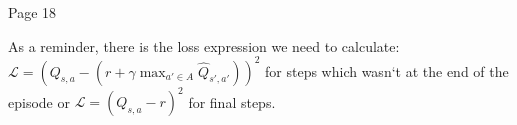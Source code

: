 Page 18

As a reminder, there is the loss expression we need to calculate: \begin{math}\mathcal{L} = (Q_{s, a} -
(r + \gamma \max_{a' \in A} \hat{Q}_{s',a'}))^2\end{math} for steps which wasn`t
  at the end of the episode or
  \begin{math}\mathcal{L} = (Q_{s, a} - r)^2\end{math} for final steps.

